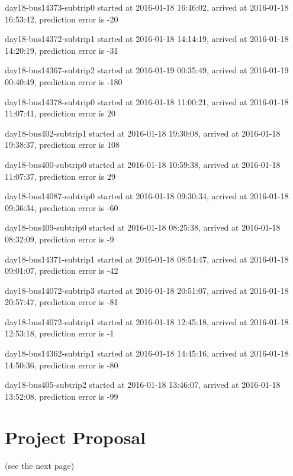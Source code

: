 \documentclass[12pt,a4paper,oneside,openright]{report}
\begin{document}
{day18-bus14373-subtrip0 started at 2016-01-18 16:46:02, arrived at 2016-01-18 16:53:42, prediction error is -20

day18-bus14372-subtrip1 started at 2016-01-18 14:14:19, arrived at 2016-01-18 14:20:19, prediction error is -31

day18-bus14367-subtrip2 started at 2016-01-19 00:35:49, arrived at 2016-01-19 00:40:49, prediction error is -180

day18-bus14378-subtrip0 started at 2016-01-18 11:00:21, arrived at 2016-01-18 11:07:41, prediction error is 20

day18-bus402-subtrip1 started at 2016-01-18 19:30:08,    arrived at 2016-01-18 19:38:37, prediction error is 108

day18-bus400-subtrip0 started at 2016-01-18 10:59:38,    arrived at 2016-01-18 11:07:37, prediction error is 29

day18-bus14087-subtrip0 started at 2016-01-18 09:30:34, arrived at 2016-01-18 09:36:34, prediction error is -60

day18-bus409-subtrip0 started at 2016-01-18 08:25:38,    arrived at 2016-01-18 08:32:09, prediction error is -9

day18-bus14371-subtrip1 started at 2016-01-18 08:54:47, arrived at 2016-01-18 09:01:07, prediction error is -42

day18-bus14072-subtrip3 started at 2016-01-18 20:51:07, arrived at 2016-01-18 20:57:47, prediction error is -81

day18-bus14072-subtrip1 started at 2016-01-18 12:45:18, arrived at 2016-01-18 12:53:18, prediction error is -1

day18-bus14362-subtrip1 started at 2016-01-18 14:45:16, arrived at 2016-01-18 14:50:36, prediction error is -80

day18-bus405-subtrip2 started at 2016-01-18 13:46:07,    arrived at 2016-01-18 13:52:08, prediction error is -99
}


\chapter{Project Proposal}
(see the next page)


\end{document}
